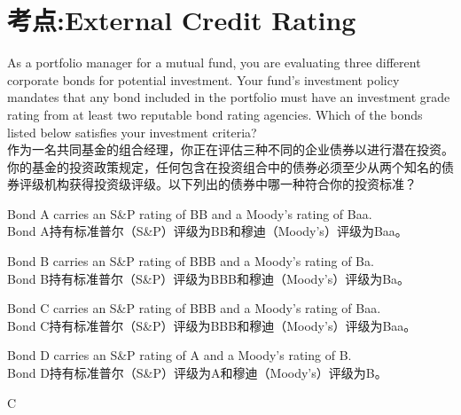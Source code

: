 \documentclass{article}
\newcounter{question} %
\begin{document}
 \tableofcontents %
\newpage







\iftrue
\section{考点:External Credit Rating}
\setcounter{question}{0}

\begin{question}
    As a portfolio manager for a mutual fund, you are evaluating three different corporate bonds for potential investment. Your fund's investment policy mandates that any bond included in the portfolio must have an investment grade rating from at least two reputable bond rating agencies. Which of the bonds listed below satisfies your investment criteria?
    \\作为一名共同基金的组合经理，你正在评估三种不同的企业债券以进行潜在投资。你的基金的投资政策规定，任何包含在投资组合中的债券必须至少从两个知名的债券评级机构获得投资级评级。以下列出的债券中哪一种符合你的投资标准？
\end{question}

\begin{choices}
    \item Bond A carries an S\&P rating of BB and a Moody’s rating of Baa. \\
    Bond A持有标准普尔（S\&P）评级为BB和穆迪（Moody’s）评级为Baa。
    \item Bond B carries an S\&P rating of BBB and a Moody’s rating of Ba. \\
    Bond B持有标准普尔（S\&P）评级为BBB和穆迪（Moody’s）评级为Ba。
    \item Bond C carries an S\&P rating of BBB and a Moody’s rating of Baa. \\
    Bond C持有标准普尔（S\&P）评级为BBB和穆迪（Moody’s）评级为Baa。
    \item Bond D carries an S\&P rating of A and a Moody’s rating of B. \\
    Bond D持有标准普尔（S\&P）评级为A和穆迪（Moody’s）评级为B。
\end{choices}

\begin{correctanswer}
   C
\end{correctanswer}
\end{document}
